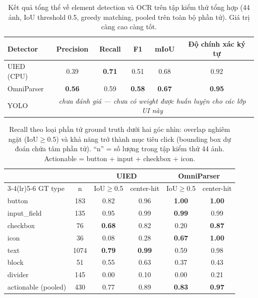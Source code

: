 \documentclass[11pt,a4paper]{article}
\begin{document}
\begin{table}[H]
  \centering
  \caption{Kết quả tổng thể về element detection và OCR trên tập kiểm thử tổng hợp
  (44 ảnh, IoU threshold 0.5, greedy matching, pooled trên toàn bộ phần tử). Giá trị
  càng cao càng tốt.}
  \label{tab:results}
  \begin{tabular}{lccccc}
    \toprule
    Detector & Precision & Recall & F1 & mIoU & Độ chính xác ký tự \\
    \midrule
    UIED (CPU)   & 0.39 & \textbf{0.71} & 0.51 & 0.68 & 0.92 \\
    OmniParser   & \textbf{0.56} & 0.59 & \textbf{0.58} & \textbf{0.67} & \textbf{0.95} \\
    YOLO         & \multicolumn{5}{c}{\emph{chưa đánh giá --- chưa có weight được huấn luyện cho các lớp UI này}} \\
    \bottomrule
  \end{tabular}
\end{table}

\begin{table}[H]
  \centering
  \caption{Recall theo loại phần tử ground truth dưới hai góc nhìn: overlap nghiêm
  ngặt (IoU$\geq$0.5) và khả năng trở thành mục tiêu click (bounding box dự đoán
  chứa tâm phần tử). ``n'' = số lượng trong tập kiểm thử 44 ảnh. Actionable = button
  + input + checkbox + icon.}
  \label{tab:pertype}
  \begin{tabular}{lc cc cc}
    \toprule
    & & \multicolumn{2}{c}{UIED} & \multicolumn{2}{c}{OmniParser} \\
    \cmidrule(lr){3-4}\cmidrule(lr){5-6}
    GT type & n & IoU$\geq$0.5 & center-hit & IoU$\geq$0.5 & center-hit \\
    \midrule
    button       & 183  & 0.82 & 0.96 & \textbf{1.00} & \textbf{1.00} \\
    input\_field & 135  & 0.95 & 0.99 & \textbf{0.99} & 0.99 \\
    checkbox     & 76   & \textbf{0.68} & 0.82 & 0.20 & \textbf{0.87} \\
    icon         & 36   & 0.08 & 0.28 & \textbf{0.67} & \textbf{1.00} \\
    text         & 1074 & \textbf{0.79} & \textbf{0.99} & 0.59 & 0.98 \\
    block        & 51   & 0.55 & 0.63 & 0.37 & 0.43 \\
    divider      & 145  & 0.00 & 0.10 & 0.00 & 0.21 \\
    \midrule
    actionable (pooled) & 430 & 0.77 & 0.89 & \textbf{0.83} & \textbf{0.97} \\
    \bottomrule
  \end{tabular}
\end{table}
\end{document}
